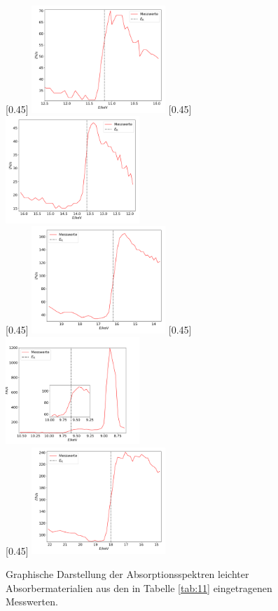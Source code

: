 \begin{figure}[h! p]
  \centering
  [0.45\textwidth]{
  \includegraphics[width=0.45\textwidth]{germanium.pdf}
  }
  [0.45\textwidth]{
  \includegraphics[width=0.45\textwidth]{brom.pdf}
  }\\
  [0.45\textwidth]{
  \includegraphics[width=0.45\textwidth]{strontium.pdf}
  }
  [0.45\textwidth]{
  \includegraphics[width=0.45\textwidth]{zink.pdf}
  }\\
  [0.45\textwidth]{
  \includegraphics[width=0.45\textwidth]{zirkonium.pdf}
  }
  \caption{Graphische Darstellung der Absorptionsspektren leichter Absorbermaterialien
  aus den in Tabelle \ref{tab:11} eingetragenen Messwerten.}
\end{figure}
